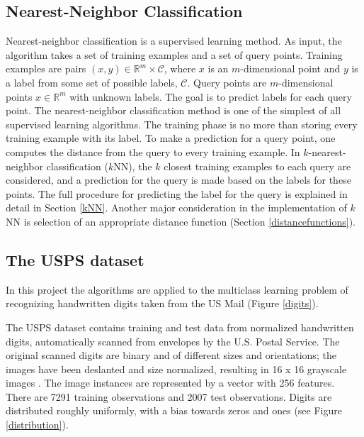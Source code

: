 \documentclass[10pt,twocolumn,letterpaper]{article}
\begin{document}
\subsection{Nearest-Neighbor Classification}
Nearest-neighbor classification is a supervised learning method. As input, the algorithm takes a set of training examples and a set of query points. Training examples are pairs $\left( x,y \right) \in \mathbb{R}^m \times \mathcal{C}$, where $x$ is an $m$-dimensional point and $y$ is a label from some set of possible labels, $\mathcal{C}$. Query points are $m$-dimensional points $x \in \mathbb{R}^m$ with unknown labels. The goal is to predict labels for each query point. The nearest-neighbor classification method is one of the simplest of all supervised learning algorithms. The training phase is no more than storing every training example with its label. To make a prediction for a query point, one computes the distance from the query to every training example. In $k$-nearest-neighbor classification ($k$NN), the $k$ closest training examples to each query are considered, and a prediction for the query is made based on the labels for these points. The full procedure for predicting the label for the query is explained in detail in Section \ref{kNN}. Another major consideration in the implementation of $k$NN is selection of an appropriate distance function (Section \ref{distancefunctions}).
 

\subsection{The USPS dataset}
In this project the algorithms are applied to the multiclass learning problem of recognizing handwritten digits taken from the US Mail (Figure \ref{digits}).

The USPS dataset contains training and test data from normalized handwritten digits, automatically
scanned from envelopes by the U.S. Postal Service. The original scanned digits are binary and of different sizes and orientations; the images have been deslanted and size normalized, resulting in 16 x 16 grayscale images \cite{LeCun}. The image instances are represented by a vector with 256 features.
There are 7291 training observations and 2007 test observations. Digits are distributed roughly uniformly, with a bias towards zeros and ones (see Figure \ref{distribution}). 
\end{document}
